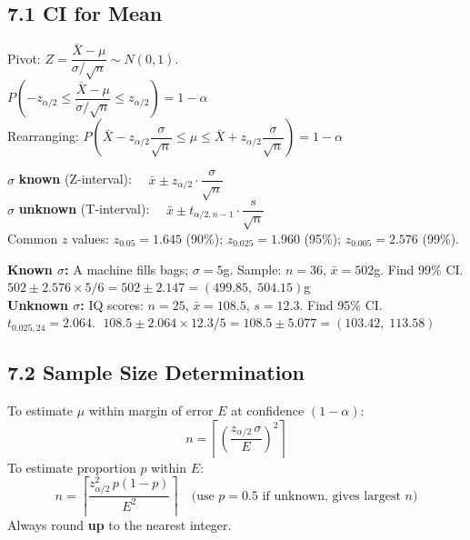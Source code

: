 \documentclass[12pt]{article}
\begin{document}
\subsection{7.1 CI for Mean}

\begin{derivbox}
Pivot: $Z=\dfrac{\bar X-\mu}{\sigma/\sqrt n}\sim N(0,1)$.\\[4pt]
$P\!\left(-z_{\alpha/2}\leq\dfrac{\bar X-\mu}{\sigma/\sqrt n}\leq z_{\alpha/2}\right)=1-\alpha$\\[4pt]
Rearranging: $P\!\left(\bar X-z_{\alpha/2}\dfrac{\sigma}{\sqrt n}\leq\mu\leq\bar X+z_{\alpha/2}\dfrac{\sigma}{\sqrt n}\right)=1-\alpha$
\end{derivbox}

\begin{formulabox}[CI for $\mu$]
$\sigma$ \textbf{known} (Z-interval): $\quad\bar x\pm z_{\alpha/2}\cdot\dfrac{\sigma}{\sqrt n}$\\[8pt]
$\sigma$ \textbf{unknown} (T-interval): $\quad\bar x\pm t_{\alpha/2,n-1}\cdot\dfrac{s}{\sqrt n}$\\[6pt]
Common $z$ values: $z_{0.05}=1.645$ (90\%); $z_{0.025}=1.960$ (95\%); $z_{0.005}=2.576$ (99\%).
\end{formulabox}

\begin{examplebox}
\textbf{Known $\sigma$:} A machine fills bags; $\sigma=5$g. Sample: $n=36$, $\bar x=502$g. Find 99\% CI.\\
$502\pm2.576\times5/6=502\pm2.147=\mathbf{(499.85,\;504.15)}$g\\[8pt]
\textbf{Unknown $\sigma$:} IQ scores: $n=25$, $\bar x=108.5$, $s=12.3$. Find 95\% CI.\\
$t_{0.025,24}=2.064$. $\;108.5\pm2.064\times12.3/5=108.5\pm5.077=\mathbf{(103.42,\;113.58)}$
\end{examplebox}

\subsection{7.2 Sample Size Determination}

\begin{formulabox}
To estimate $\mu$ within margin of error $E$ at confidence $(1-\alpha)$:
\[n=\left\lceil\left(\frac{z_{\alpha/2}\,\sigma}{E}\right)^2\right\rceil\]
To estimate proportion $p$ within $E$:
\[n=\left\lceil\frac{z_{\alpha/2}^2\,p(1-p)}{E^2}\right\rceil\quad\text{(use }p=0.5\text{ if unknown, gives largest }n\text{)}\]
Always round \textbf{up} to the nearest integer.
\end{formulabox}
\end{document}
